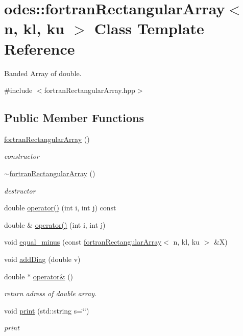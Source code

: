 \hypertarget{classodes_1_1fortranRectangularArray}{}\section{odes\+:\+:fortran\+Rectangular\+Array$<$ n, kl, ku $>$ Class Template Reference}
\label{classodes_1_1fortranRectangularArray}


Banded Array of double.  




{\ttfamily \#include $<$fortran\+Rectangular\+Array.\+hpp$>$}

\subsection*{Public Member Functions}
\begin{DoxyCompactItemize}
\item 
\hyperlink{classodes_1_1fortranRectangularArray_afc21433e23b1f87f081c16aad69797c3}{fortran\+Rectangular\+Array} ()
\begin{DoxyCompactList}\small\item\em constructor \end{DoxyCompactList}\item 
\hyperlink{classodes_1_1fortranRectangularArray_aa8107277abfee9bd62a6f985d5b0eb5e}{$\sim$fortran\+Rectangular\+Array} ()
\begin{DoxyCompactList}\small\item\em destructor \end{DoxyCompactList}\item 
double \hyperlink{classodes_1_1fortranRectangularArray_a78270346dfd3c729d8af92ff844cb636}{operator()} (int i, int j) const 
\item 
double \& \hyperlink{classodes_1_1fortranRectangularArray_a96a5a86a0aae4febde3e840cd838fa23}{operator()} (int i, int j)
\item 
void \hyperlink{classodes_1_1fortranRectangularArray_a68b23264bb323bb535829b37bdb77d56}{equal\+\_\+minus} (const \hyperlink{classodes_1_1fortranRectangularArray}{fortran\+Rectangular\+Array}$<$ n, kl, ku $>$ \&X)
\item 
void \hyperlink{classodes_1_1fortranRectangularArray_aab169d24979d69fbb20a50cca6594e8b}{add\+Diag} (double v)
\item 
double $\ast$ \hyperlink{classodes_1_1fortranRectangularArray_ad76acc043e0630c1a14f4eb4dafe2ec4}{operator\&} ()
\begin{DoxyCompactList}\small\item\em return adress of double array. \end{DoxyCompactList}\item 
void \hyperlink{classodes_1_1fortranRectangularArray_ae4731c4daef1ead6bd0e49734c248442}{print} (std\+::string s=\char`\"{}\char`\"{})
\begin{DoxyCompactList}\small\item\em print \end{DoxyCompactList}\end{DoxyCompactItemize}
